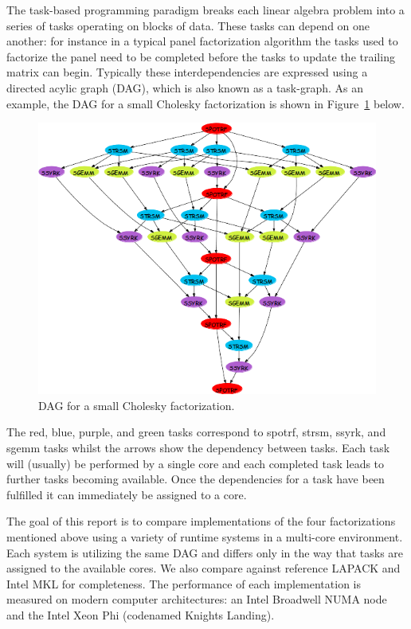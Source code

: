 \documentclass[a4paper,12pt]{article}
\begin{document}
The task-based programming paradigm breaks each linear algebra
problem into a series of tasks operating on blocks of data.
These tasks can depend on one another:
for instance in a typical panel factorization algorithm
the tasks used to factorize the panel need to be completed
before the tasks to update the trailing matrix can begin.
Typically these interdependencies are expressed using a
directed acylic graph (DAG),
which is also known as a task-graph.
As an example,
the DAG for a small Cholesky factorization is shown in
Figure~\ref{fig.chol_dag} below.
\begin{figure}[th]
  \centering
  \includegraphics[scale=.6]{fig/spotrf_dag.png}
  \caption{DAG for a small Cholesky factorization.}
  \label{fig.chol_dag}
\end{figure}

The red, blue, purple, and green tasks correspond to
spotrf, strsm, ssyrk, and sgemm tasks
whilst the arrows show the dependency between tasks.
Each task will (usually) be performed by a single core
and each completed task leads to further tasks becoming available.
Once the dependencies for a task have been fulfilled it
can immediately be assigned to a core.

The goal of this report is to compare implementations of
the four factorizations mentioned above
using a variety of runtime systems in a multi-core environment.
Each system is utilizing the same DAG and differs only in the way
that tasks are assigned to the available cores.
We also compare against reference LAPACK and Intel MKL
for completeness.
The performance of each implementation is measured
on modern computer architectures:
an Intel Broadwell NUMA node
and the Intel Xeon Phi (codenamed Knights Landing).
\end{document}
